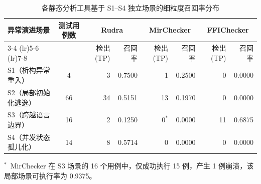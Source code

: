 %
%

\begin{table}[htbp]
  \centering
  \caption{各静态分析工具基于 S1--S4 独立场景的细粒度召回率分布}
  \label{tab:fine-grained-recall-s1-s4}
  \setlength{\tabcolsep}{6pt}
  \begin{tabular}{@{}l c *{6}{r}@{}}
    \toprule
    \multirow{2}{*}{异常演进场景}
    & \multirow{2}{*}{测试用例数}
    & \multicolumn{2}{c}{Rudra}
    & \multicolumn{2}{c}{MirChecker}
    & \multicolumn{2}{c}{FFIChecker} \\
    \cmidrule(lr){3-4}
    \cmidrule(lr){5-6}
    \cmidrule(lr){7-8}
    & & 检出 (TP) & 召回率 & 检出 (TP) & 召回率 & 检出 (TP) & 召回率 \\
    \midrule
    S1（析构异常重入）     &  4 &  3 & 0.7500 &  1 & 0.2500 &  0 & 0.0000 \\
    S2（局部初始化逃逸）   & 66 & 34 & 0.5151 & 13 & 0.1970 &  0 & 0.0000 \\
    S3（跨越语言边界）     & 16 &  2 & 0.1250 &  $0^{*}$ & 0.0000 & 11 & 0.6875 \\
    S4（并发状态孤儿化）   & 14 &  8 & 0.5714 &  0 & 0.0000 &  0 & 0.0000 \\
    \bottomrule
  \end{tabular}

  \begin{minipage}{0.95\linewidth}\footnotesize\setlength{\parskip}{0.25em}
    $^{*}$~MirChecker 在 S3 场景的 16 个用例中，仅成功执行 15 例，产生 1 例崩溃，该局部场景可执行率为 0.9375。
  \end{minipage}
\end{table}
